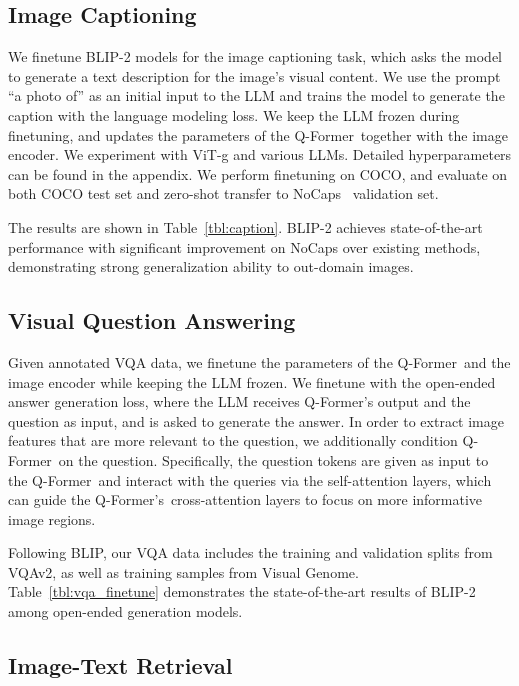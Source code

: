 \subsection{Image Captioning}

We finetune BLIP-2 models for the image captioning task, which asks the model to generate a text description for the image's visual content. We use the prompt ``a photo of'' as an initial input to the LLM and trains the model to generate the caption with the language modeling loss. We keep the LLM frozen during finetuning, and updates the parameters of the Q-Former~together with the image encoder. We experiment with ViT-g and various LLMs. Detailed hyperparameters can be found in the appendix. We perform finetuning on COCO, and evaluate on both COCO test set and zero-shot transfer to NoCaps~\cite{nocaps} validation set.

The results are shown in Table~\ref{tbl:caption}.
BLIP-2 achieves state-of-the-art performance with significant improvement on NoCaps over existing methods, demonstrating strong generalization ability to out-domain images.

\subsection{Visual Question Answering}

Given annotated VQA data, we finetune the parameters of the Q-Former~and the image encoder while keeping the LLM frozen. We finetune with the open-ended answer generation loss, where the LLM receives Q-Former's output and the question as input, and is asked to generate the answer. In order to extract image features that are more relevant to the question, we additionally condition Q-Former~on the question. Specifically, the question tokens are given as input to the Q-Former~and interact with the queries via the self-attention layers, which can guide the Q-Former's~cross-attention layers to focus on more informative image regions.

Following BLIP, our VQA data includes the training and validation splits from VQAv2, as well as training samples from Visual Genome.
Table~\ref{tbl:vqa_finetune} demonstrates the state-of-the-art results of BLIP-2 among open-ended generation models.

\subsection{Image-Text Retrieval}

